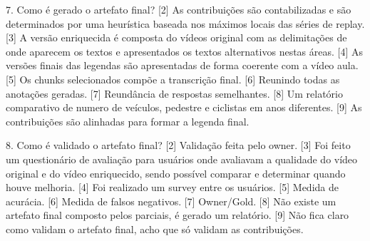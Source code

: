 7.	Como é gerado o artefato final?
[2] As contribuições são contabilizadas e são determinados por uma heurística baseada nos máximos locais das séries de replay. 
[3] A versão enriquecida é composta do vídeos original com as delimitações de onde aparecem os textos e apresentados os textos alternativos nestas áreas.
[4] As versões finais das legendas são apresentadas de forma coerente com a vídeo aula. 
[5] Os chunks selecionados compõe a transcrição final.
[6] Reunindo todas as anotações geradas.
[7] Reundância de respostas semelhantes.
[8] Um relatório comparativo de numero de veículos, pedestre e ciclistas em anos diferentes.
[9] As contribuições são alinhadas para formar a legenda final.


8.	Como é validado o artefato final?
[2] Validação feita pelo owner.
[3] Foi feito um questionário de avaliação para usuários onde avaliavam a qualidade do vídeo original e do vídeo enriquecido, sendo possível comparar e determinar quando houve melhoria.
[4] Foi realizado um survey entre os usuários.
[5] Medida de acurácia.
[6] Medida de falsos negativos.
[7] Owner/Gold.
[8] Não existe um artefato final composto pelos parciais, é gerado um relatório. 
[9] Não fica claro como validam o artefato final, acho que só validam as contribuições.



